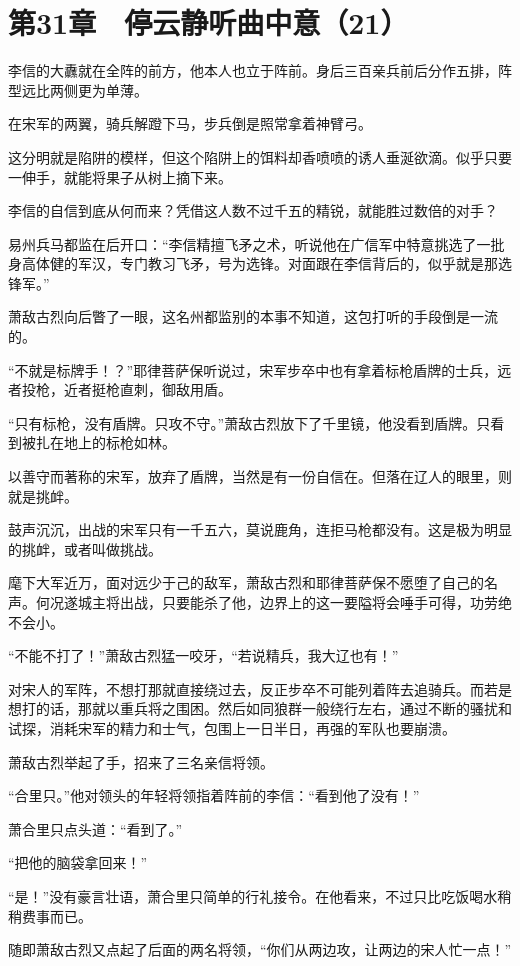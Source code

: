 \section{第31章　停云静听曲中意（21）}

李信的大纛就在全阵的前方，他本人也立于阵前。身后三百亲兵前后分作五排，阵型远比两侧更为单薄。

在宋军的两翼，骑兵解蹬下马，步兵倒是照常拿着神臂弓。

这分明就是陷阱的模样，但这个陷阱上的饵料却香喷喷的诱人垂涎欲滴。似乎只要一伸手，就能将果子从树上摘下来。

李信的自信到底从何而来？凭借这人数不过千五的精锐，就能胜过数倍的对手？

易州兵马都监在后开口：“李信精擅飞矛之术，听说他在广信军中特意挑选了一批身高体健的军汉，专门教习飞矛，号为选锋。对面跟在李信背后的，似乎就是那选锋军。”

萧敌古烈向后瞥了一眼，这名州都监别的本事不知道，这包打听的手段倒是一流的。

“不就是标牌手！？”耶律菩萨保听说过，宋军步卒中也有拿着标枪盾牌的士兵，远者投枪，近者挺枪直刺，御敌用盾。

“只有标枪，没有盾牌。只攻不守。”萧敌古烈放下了千里镜，他没看到盾牌。只看到被扎在地上的标枪如林。

以善守而著称的宋军，放弃了盾牌，当然是有一份自信在。但落在辽人的眼里，则就是挑衅。

鼓声沉沉，出战的宋军只有一千五六，莫说鹿角，连拒马枪都没有。这是极为明显的挑衅，或者叫做挑战。

麾下大军近万，面对远少于己的敌军，萧敌古烈和耶律菩萨保不愿堕了自己的名声。何况遂城主将出战，只要能杀了他，边界上的这一要隘将会唾手可得，功劳绝不会小。

“不能不打了！”萧敌古烈猛一咬牙，“若说精兵，我大辽也有！”

对宋人的军阵，不想打那就直接绕过去，反正步卒不可能列着阵去追骑兵。而若是想打的话，那就以重兵将之围困。然后如同狼群一般绕行左右，通过不断的骚扰和试探，消耗宋军的精力和士气，包围上一日半日，再强的军队也要崩溃。

萧敌古烈举起了手，招来了三名亲信将领。

“合里只。”他对领头的年轻将领指着阵前的李信：“看到他了没有！”

萧合里只点头道：“看到了。”

“把他的脑袋拿回来！”

“是！”没有豪言壮语，萧合里只简单的行礼接令。在他看来，不过只比吃饭喝水稍稍费事而已。

随即萧敌古烈又点起了后面的两名将领，“你们从两边攻，让两边的宋人忙一点！”

